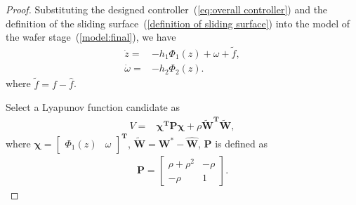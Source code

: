 \documentclass{ifacconf}
\begin{document}
\begin{proof}
Substituting the designed controller~(\ref{eq:overall controller}) and the definition of the sliding surface~(\ref{definition of sliding surface}) into the model of the wafer stage~(\ref{model:final}), we have
\begin{align}\label{dynamics of s in proof}
\dot{z}=&-h_1\Phi_1(z)+\omega+\tilde{f},  \\
\dot{\omega}=&-h_2 \Phi_2(z).
\end{align}
where $\tilde{f}=f-\hat{f}$.

Select a Lyapunov function candidate as
  \begin{align}
 V =&\bm{\chi^T}\bm{P}\bm{ \chi} + \rho \bm{\tilde{W}}^{\bm{T}}\bm{\tilde{W}}, \label{eq:V}
\end{align}
  where $\bm{\chi}=
    \left[
    \begin{array}{cc}
      \Phi_1(z) & \omega
    \end{array}
    \right]^{\bm{T}}$, $\bm{\tilde{W}}=\bm{W}^*-\bm{\hat{W}}$, $\bm{P}$ is defined as
\begin{align}
   \bm{P}=
  \left[
    \begin{array}{cc}
      \rho +\rho ^2 & -\rho  \\
      -\rho  & 1
    \end{array}
  \right].
\end{align}


\end{proof}
\end{document}
